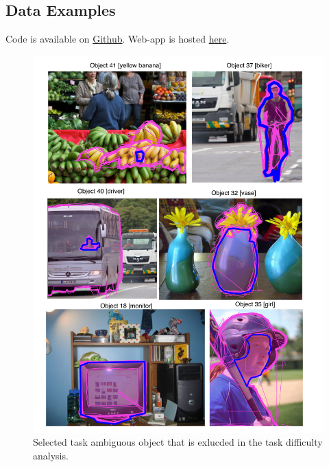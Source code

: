 \documentclass[12pt]{article}
\begin{document}
\begin{appendices}
\newpage

\section{Data Examples}
Code is available on \href{https://github.com/dorisjlee/crowd-seg}{Github}. Web-app is hosted \href{https://crowd-segment.herokuapp.com/segment/COCO_train2014_000000000127/12/}{here}.
\begin{figure}[ht]
\centering
\includegraphics[width=\linewidth]{plots/task_ambiguous_cases.pdf}
\caption{Selected task ambiguous object that is exlucded in the task difficulty analysis. }
\end{figure}

\end{appendices}
\end{document}
